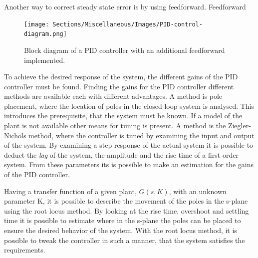 \documentclass[../../main.tex]{subfiles}
\begin{document}
Another way to correct steady state error is by using feedforward. Feedforward
\begin{figure}[]
    \centering
    \texttt{[image: Sections/Miscellaneous/Images/PID-control-diagram.png]}
    \caption{Block diagram of a PID controller with an additional feedforward implemented.}
    \label{fig:PID_controller}
\end{figure}


To achieve the desired response of the system, the different gains of the PID controller must be found. Finding the gains for the PID controller different methods are available each with different advantages. A method is pole placement, where the location of poles in the closed-loop system is analysed. This introduces the prerequisite, that the system must be known. If a model of the plant is not available other means for tuning is present. A method is the Ziegler-Nichols method, where the controller is tuned by examining the input and output of the system. By examining a step response of the actual system it is possible to deduct the \textit{lag} of the system, the amplitude and the rise time of a first order system. From these parameters its is possible to make an estimation for the gains of the PID controller.

Having a transfer function of a given plant, $G(s,K)$, with an unknown parameter K, it is possible to describe the movement of the poles in the s-plane using the root locus method. By looking at the rise time, overshoot and settling time it is possible to estimate where in the s-plane the poles can be placed to ensure the desired behavior of the system. %
With the root locus method, it is possible to tweak the controller in such a manner, that the system satisfies the requirements.
\end{document}
